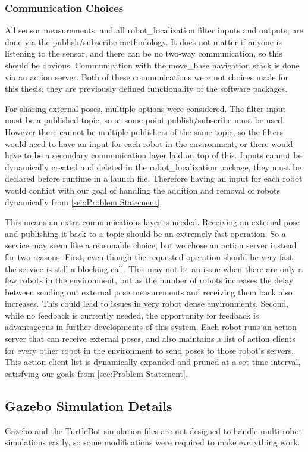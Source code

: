 \documentclass[thesis.tex]{subfile}
\begin{document}
\subsubsection{Communication Choices}
All sensor measurements, and all robot\_localization filter inputs and outputs, are done via the publish/subscribe methodology. It does not matter if anyone is listening to the sensor, and there can be no two-way communication, so this should be obvious. Communication with the move\_base navigation stack is done via an action server. Both of these communications were not choices made for this thesis, they are previously defined functionality of the software packages.

For sharing external poses, multiple options were considered. The filter input must be a published topic, so at some point publish/subscribe must be used. However there cannot be multiple publishers of the same topic, so the filters would need to have an input for each robot in the environment, or there would have to be a secondary communication layer laid on top of this. Inputs cannot be dynamically created and deleted in the robot\_localization package, they must be declared before runtime in a launch file. Therefore having an input for each robot would conflict with our goal of handling the addition and removal of robots dynamically from \autoref{sec:Problem Statement}.

This means an extra communications layer is needed. Receiving an external pose and publishing it back to a topic should be an extremely fast operation. So a service may seem like a reasonable choice, but we chose an action server instead for two reasons. First, even though the requested operation should be very fast, the service is still a blocking call. This may not be an issue when there are only a few robots in the environment, but as the number of robots increases the delay between sending out external pose measurements and receiving them back also increases. This could lead to issues in very robot dense environments. Second, while no feedback is currently needed, the opportunity for feedback is advantageous in further developments of this system. Each robot runs an action server that can receive external poses, and also maintains a list of action clients for every other robot in the environment to send poses to those robot's servers. This action client list is dynamically expanded and pruned at a set time interval, satisfying our goals from \autoref{sec:Problem Statement}.

\subsection{Gazebo Simulation Details} \label{sec:sim_details}
Gazebo and the TurtleBot simulation files are not designed to handle multi-robot simulations easily, so some modifications were required to make everything work.
\end{document}
